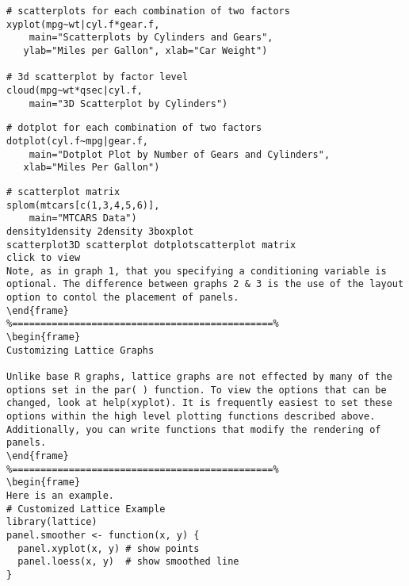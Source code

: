 \begin{frame}[fragile]
\begin{framed}
\begin{verbatim}
# scatterplots for each combination of two factors 
xyplot(mpg~wt|cyl.f*gear.f, 
  	main="Scatterplots by Cylinders and Gears", 
   ylab="Miles per Gallon", xlab="Car Weight")

# 3d scatterplot by factor level 
cloud(mpg~wt*qsec|cyl.f, 
  	main="3D Scatterplot by Cylinders") 
\end{verbatim}
\end{framed}
\end{frame}
\begin{frame}[fragile]
\begin{framed}
\begin{verbatim}
# dotplot for each combination of two factors 
dotplot(cyl.f~mpg|gear.f, 
  	main="Dotplot Plot by Number of Gears and Cylinders",
   xlab="Miles Per Gallon")
\end{verbatim}
\end{framed}
\end{frame}
\begin{frame}[fragile]
\begin{framed}
\begin{verbatim}
# scatterplot matrix 
splom(mtcars[c(1,3,4,5,6)], 
  	main="MTCARS Data")
density1density 2density 3boxplot
scatterplot3D scatterplot dotplotscatterplot matrix
click to view
Note, as in graph 1, that you specifying a conditioning variable is optional. The difference between graphs 2 & 3 is the use of the layout option to contol the placement of panels.
\end{frame}
%==============================================%
\begin{frame}
Customizing Lattice Graphs

Unlike base R graphs, lattice graphs are not effected by many of the options set in the par( ) function. To view the options that can be changed, look at help(xyplot). It is frequently easiest to set these options within the high level plotting functions described above. Additionally, you can write functions that modify the rendering of panels. 
\end{frame}
%==============================================%
\begin{frame}
Here is an example.
# Customized Lattice Example
library(lattice)
panel.smoother <- function(x, y) {
  panel.xyplot(x, y) # show points 
  panel.loess(x, y)  # show smoothed line 
}
\end{verbatim}
\end{framed}
\end{frame}
